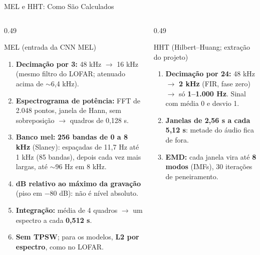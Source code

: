 \documentclass[aspectratio=169]{beamer}
\begin{document}
\begin{frame}{MEL e HHT: Como São Calculados}
    \footnotesize
    \vspace{-4pt}
    \begin{columns}[T]
        \begin{column}{0.49\textwidth}
            \begin{block}{\small MEL (entrada da CNN MEL)}
                \scriptsize
                \begin{enumerate}
                    \setlength{\itemsep}{1pt}
                    \item \textbf{Decimação por 3:} 48 kHz $\to$ 16 kHz (mesmo filtro do LOFAR; atenuado acima de $\sim$6,4 kHz).
                    \item \textbf{Espectrograma de potência:} FFT de 2.048 pontos, janela de Hann, sem sobreposição $\to$ quadros de 0,128 s.
                    \item \textbf{Banco mel:} \textbf{256 bandas de 0 a 8 kHz} (Slaney): espaçadas de 11,7 Hz até 1 kHz (85 bandas), depois cada vez mais largas, até $\sim$96 Hz em 8 kHz.
                    \item \textbf{dB relativo ao máximo da gravação} (piso em $-$80 dB): não é nível absoluto.
                    \item \textbf{Integração:} média de 4 quadros $\to$ um espectro a cada \textbf{0,512 s}.
                    \item \textbf{Sem TPSW}; para os modelos, \textbf{L2 por espectro}, como no LOFAR.
                \end{enumerate}
            \end{block}
        \end{column}
        \begin{column}{0.49\textwidth}
            \begin{block}{\small HHT (Hilbert--Huang; extração do projeto)}
                \scriptsize
                \begin{enumerate}
                    \setlength{\itemsep}{1pt}
                    \item \textbf{Decimação por 24:} 48 kHz $\to$ \textbf{2 kHz} (FIR, fase zero) $\to$ só \textbf{1--1.000 Hz}. Sinal com média 0 e desvio 1.
                    \item \textbf{Janelas de 2,56 s a cada 5,12 s}: metade do áudio fica de fora.
                    \item \textbf{EMD:} cada janela vira até \textbf{8 modos} (IMFs), 30 iterações de peneiramento.

\end{enumerate}
\end{block}
\end{column}
\end{columns}
\end{frame}
\end{document}
